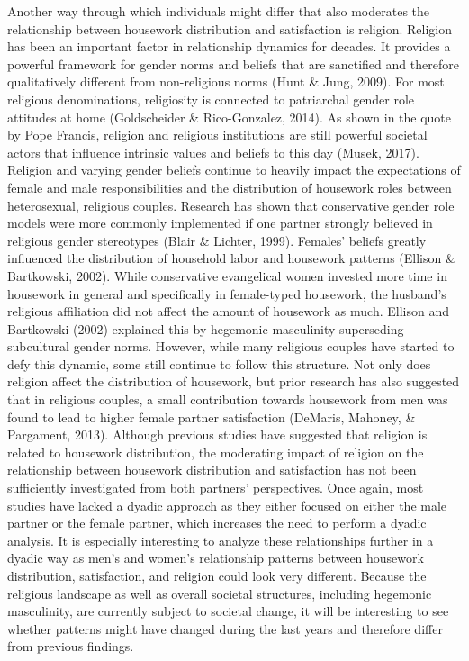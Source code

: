 \documentclass[
  man,floatsintext]{apa6}
\begin{document}
Another way through which individuals might differ that also moderates the relationship between housework distribution and satisfaction is religion. Religion has been an important factor in relationship dynamics for decades. It provides a powerful framework for gender norms and beliefs that are sanctified and therefore qualitatively different from non-religious norms (Hunt \& Jung, 2009). For most religious denominations, religiosity is connected to patriarchal gender role attitudes at home (Goldscheider \& Rico-Gonzalez, 2014). As shown in the quote by Pope Francis, religion and religious institutions are still powerful societal actors that influence intrinsic values and beliefs to this day (Musek, 2017). Religion and varying gender beliefs continue to heavily impact the expectations of female and male responsibilities and the distribution of housework roles between heterosexual, religious couples. Research has shown that conservative gender role models were more commonly implemented if one partner strongly believed in religious gender stereotypes (Blair \& Lichter, 1999). Females' beliefs greatly influenced the distribution of household labor and housework patterns (Ellison \& Bartkowski, 2002). While conservative evangelical women invested more time in housework in general and specifically in female-typed housework, the husband's religious affiliation did not affect the amount of housework as much. Ellison and Bartkowski (2002) explained this by hegemonic masculinity superseding subcultural gender norms. However, while many religious couples have started to defy this dynamic, some still continue to follow this structure. Not only does religion affect the distribution of housework, but prior research has also suggested that in religious couples, a small contribution towards housework from men was found to lead to higher female partner satisfaction (DeMaris, Mahoney, \& Pargament, 2013). Although previous studies have suggested that religion is related to housework distribution, the moderating impact of religion on the relationship between housework distribution and satisfaction has not been sufficiently investigated from both partners' perspectives. Once again, most studies have lacked a dyadic approach as they either focused on either the male partner or the female partner, which increases the need to perform a dyadic analysis. It is especially interesting to analyze these relationships further in a dyadic way as men's and women's relationship patterns between housework distribution, satisfaction, and religion could look very different. Because the religious landscape as well as overall societal structures, including hegemonic masculinity, are currently subject to societal change, it will be interesting to see whether patterns might have changed during the last years and therefore differ from previous findings.
\end{document}
